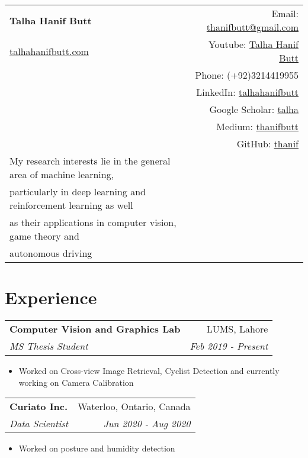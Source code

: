 \documentclass[letterpaper,11pt]{article}
\makeatletter
\newcommand{\resumeSubheading}[4]{
  \vspace{-1pt}\item
    \begin{tabular*}{0.97\textwidth}[t]{l@{\extracolsep{\fill}}r}
      \textbf{#1} & #2 \\
      \textit{\small#3} & \textit{\small #4} \\
    \end{tabular*}\vspace{-5pt}
}
\makeatother
\begin{document}
\begin{tabular*}{\textwidth}{l@{\extracolsep{\fill}}r}
  \textbf{{\Large Talha Hanif Butt}} & Email: \href{mailto:thanifbutt@gmail.com}{thanifbutt@gmail.com}\\
  \href{https://sites.google.com/view/talhahanifbutt}{talhahanifbutt.com}& Youtube: \href{https://www.youtube.com/channel/UCcXj3DvzVAuDrDsO4CvcO6w}{Talha Hanif Butt}\\& Phone: {(+92)3214419955}\\ & LinkedIn: \href{https://pk.linkedin.com/in/talhahanifbutt}{talhahanifbutt}\\
& Google Scholar: \href{https://scholar.google.com/citations?hl=en&user=2OZ4dKsAAAAJ}{talha}\\
& Medium: \href{https://medium.com/@thanifbutt}{thanifbutt}\\  
& GitHub: \href{https://github.com/thanif}{thanif}\\


My research interests lie in the general area of machine learning,\\ particularly in deep learning and reinforcement learning as well\\ as their applications in computer vision, game theory and\\ autonomous driving


\end{tabular*}


\section{Experience}

			\resumeSubheading
      			{Computer Vision and Graphics Lab}{LUMS, Lahore}
      			{MS Thesis Student}{Feb 2019 - Present}
      
        
          \begin{itemize}
  				\item Worked on Cross-view Image Retrieval, Cyclist Detection and currently working on Camera Calibration
			\end{itemize}


			\resumeSubheading
      			{Curiato Inc.}{Waterloo, Ontario, Canada}
      			{Data Scientist}{Jun 2020 - Aug 2020}
      			
      			\begin{itemize}
  				\item Worked on posture and humidity detection
			\end{itemize}
			
\end{document}
